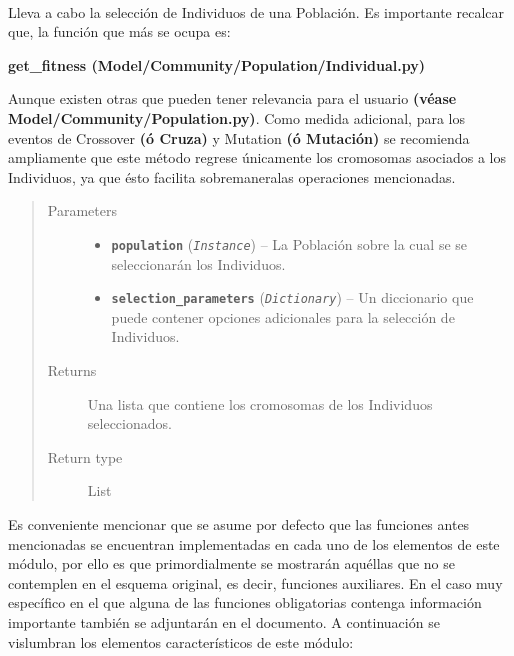 \documentclass[class=report, crop=false]{standalone}
\begin{document}
\begin{fulllineitems}

~
\vspace{-0.1cm}

Lleva a cabo la selección de Individuos de una Población. 
Es importante recalcar que, la función que más se ocupa es:

\begin{center}\textbf{get\_fitness (Model/Community/Population/Individual.py)}
\end{center}

Aunque existen otras que pueden tener relevancia para el usuario 
\textbf{(véase Model/}\break\textbf{Community/Population.py)}.\medskip\break
Como medida adicional, para los eventos de Crossover \textbf{(ó Cruza)} 
y Mutation \textbf{(ó Mutación)} se recomienda ampliamente que este 
método regrese únicamente los cromosomas asociados a los Individuos, 
ya que ésto facilita sobremaneralas operaciones mencionadas.

\begin{quote}\begin{description}
\item[{Parameters}] \leavevmode\begin{itemize}
\item \textbf{\texttt{population}} (\emph{\texttt{Instance}}) -- La Población sobre la cual se se seleccionarán los Individuos.
\item \textbf{\texttt{selection\_parameters}} (\emph{\texttt{Dictionary}}) -- Un diccionario que puede contener opciones adicionales para la
selección de Individuos.
\end{itemize}
\item[{Returns}] \leavevmode
Una lista que contiene los cromosomas de los Individuos seleccionados.
\item[{Return type}] \leavevmode
List
\end{description}\end{quote}

\end{fulllineitems}

Es conveniente mencionar que se asume por defecto que las funciones antes 
mencionadas se encuentran implementadas en cada uno de los elementos de este 
módulo, por ello es que primordialmente se mostrarán aquéllas que no se 
contemplen en el esquema original, es decir, funciones auxiliares.\break
En el caso muy específico en el que alguna de las funciones obligatorias 
contenga información importante también se adjuntarán en el documento.\medskip\break  
A continuación se vislumbran los elementos característicos 
de este módulo:
\end{document}
